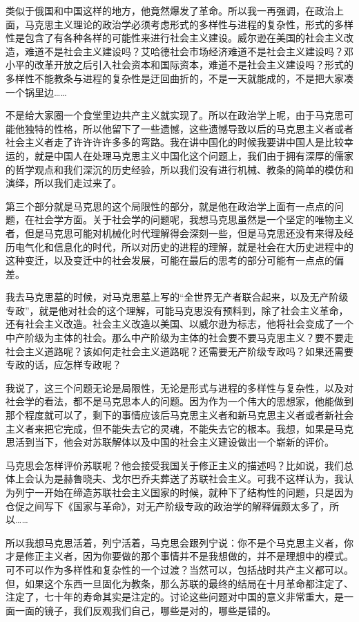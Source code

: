 \documentclass[UTF8, 12pt, a4paper]{ctexrep}
\begin{document}
类似于俄国和中国这样的地方，他竟然爆发了革命。所以我一再强调，在政治上面，马克思主义理论的政治学必须考虑形式的多样性与进程的复杂性，形式的多样性是包含了有各种各样的可能性来进行社会主义建设。威尔逊在美国的社会主义改造，难道不是社会主义建设吗？艾哈德社会市场经济难道不是社会主义建设吗？邓小平的改革开放之后引入社会资本和国际资本，难道不是社会主义建设吗？形式的多样性不能教条与进程的复杂性是迂回曲折的，不是一天就能成的，不是把大家凑一个锅里边……

不是给大家圈一个食堂里边共产主义就实现了。所以在政治学上呢，由于马克思可能他独特的性格，所以他留下了一些遗憾，这些遗憾导致以后的马克思主义者或者社会主义者走了许许许许多多的弯路。我在讲中国化的时候我要讲中国人是比较幸运的，就是中国人在处理马克思主义中国化这个问题上，我们由于拥有深厚的儒家的哲学观点和我们深沉的历史经验，所以我们没有进行机械、教条的简单的模仿和演绎，所以我们走过来了。

第三个部分就是马克思的这个局限性的部分，就是他在政治学上面有一点点的问题，在社会学方面。关于社会学的问题呢，我想马克思虽然是一个坚定的唯物主义者，但是马克思可能对机械化时代理解得会深刻一些，但是马克思还没有来得及经历电气化和信息化的时代，所以对历史的进程的理解，就是社会在大历史进程中的这种变迁，以及变迁中的社会发展，可能在最后的思考的部分可能有一点点的偏差。

我去马克思墓的时候，对马克思墓上写的“全世界无产者联合起来，以及无产阶级专政”，就是他对社会的这个理解，可能马克思没有预料到，除了社会主义革命，还有社会主义改造。社会主义改造以美国、以威尔逊为标志，他将社会变成了一个中产阶级为主体的社会。那么中产阶级为主体的社会要不要马克思主义？要不要走社会主义道路呢？该如何走社会主义道路呢？还需要无产阶级专政吗？如果还需要专政的话，应怎样专政呢？

我说了，这三个问题无论是局限性，无论是形式与进程的多样性与复杂性，以及对社会学的看法，都不是马克思本人的问题。因为作为一个伟大的思想家，他能做到那个程度就可以了，剩下的事情应该后马克思主义者和新马克思主义者或者新社会主义者来把它完成，但不能失去它的灵魂，不能失去它的根本。我想，如果是马克思活到当下，他会对苏联解体以及中国的社会主义建设做出一个崭新的评价。

马克思会怎样评价苏联呢？他会接受我国关于修正主义的描述吗？比如说，我们总体上会认为是赫鲁晓夫、戈尔巴乔夫葬送了苏联社会主义。可我不这样认为，我认为列宁一开始在缔造苏联社会主义国家的时候，就种下了结构性的问题，只是因为仓促之间写下《国家与革命》，对无产阶级专政的政治学的解释偏颇太多了，所以……

所以我想马克思活着，列宁活着，马克思会跟列宁说：你不是个马克思主义者，你才是修正主义者，因为你要做的那个事情并不是我想做的，并不是理想中的模式。可不可以作为多样性和复杂性的一个过渡？当然可以，包括战时共产主义都可以。但，如果这个东西一旦固化为教条，那么苏联的最终的结局在十月革命都注定了、注定了，七十年的寿命其实是注定的。讨论这些问题对中国的意义非常重大，是一面一面的镜子，我们反观我们自己，哪些是对的，哪些是错的。
\end{document}
